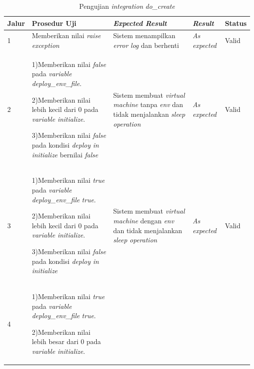 \begin{longtable}{|P{.06\textwidth}|P{.30\textwidth}|P{.30\textwidth}|P{.10\textwidth}|P{.08\textwidth}|}
  \caption{Pengujian \emph{integration} \emph{do\_create}} \label{jalur:create-vm-f} \\
  \hline
  \textbf{Jalur} & \textbf{Prosedur Uji} & \textbf{\emph{Expected Result}}
  & \textbf{\emph{Result}} & \textbf{Status} \\\hline
  1 & Memberikan nilai \emph{raise exception} & Sistem menampilkan \emph{error log} dan
                               berhenti & \emph{As expected} & Valid \\\hline
  2 & 1)Memberikan nilai \emph{false} pada \emph{variable deploy\_env\_file}. \par\null\par
      2)Memberikan nilai lebih kecil dari 0 pada \emph{variable initialize}. \par\null\par
      3)Memberikan nilai \emph{false} pada kondisi \emph{deploy in initialize} bernilai \emph{false}
                                             & Sistem membuat
                                               \emph{virtual machine} tanpa \emph{env} dan tidak menjalankan
                                               \emph{sleep operation} & \emph{As expected} & Valid \\\hline
  3 & 1)Memberikan nilai \emph{true} pada \emph{variable deploy\_env\_file} \emph{true}. \par\null\par
      2)Memberikan nilai lebih kecil dari 0 pada \emph{variable initialize}. \par\null\par
      3)Memberikan nilai \emph{false} pada kondisi \emph{deploy in initialize}
                                             & Sistem membuat
                                               \emph{virtual machine} dengan \emph{env} dan tidak menjalankan
                                               \emph{sleep operation} & \emph{As expected} & Valid \\\hline
  4 & 1)Memberikan nilai \emph{true} pada \emph{variable deploy\_env\_file} \emph{true}. \par\null\par
      2)Memberikan nilai lebih besar dari 0 pada  \emph{variable initialize}. \par\null\par

\end{longtable}

